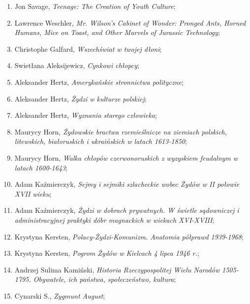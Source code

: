 \documentclass[a4paper,11pt]{article}
\begin{document}
\begin{enumerate}
\item Jon Savage, \textit{Teenage: The Creation of Youth Culture};

\item Lawrence Weschler, \textit{Mr. Wilson's Cabinet of Wonder: Pronged
    Ants, Horned Humans, Mice on Toast, and Other Marvels of Jurassic
    Technology};

\item Christophe Galfard, \textit{Wszechświat w twojej dłoni};

\item Swietłana Aleksijewicz, \textit{Cynkowi chłopcy};

\item Aleksander Hertz, \textit{Amerykańskie stronnictwa polityczne};

\item Aleksander Hertz, \textit{Żydzi w kulturze polskiej};

\item Aleksander Hertz, \textit{Wyznania starego człowieka};

\item Maurycy Horn, \textit{Żydowskie bractwa rzemieślnicze na ziemiach
    polskich, litewskich, białoruskich i ukraińskich w latach
    1613-1850};

\item Maurycy Horn, \textit{Walka chłopów czerwonoruskich z wyzyskiem
    feudalnym w latach 1600-1643};


\item Adam Kaźmierczyk, \textit{Sejmy i sejmiki szlacheckie wobec Żydów
    w II połowie XVII wieku};

\item Adam Kaźmierczyk, \textit{Żydzi w dobrach prywatnych. W świetle
    sądowniczej i administracyjnej praktyki dóbr magnackich w wiekach
    XVI-XVIII};

\item Krystyna Kersten, \textit{Polacy-Żydzi-Komunizm. Anatomia półprawd
    1939-1968};

\item Krystyna Kersten, \textit{Pogrom Żydów w Kielcach 4 lipca 1946
    r.};

\item Andrzej Sulima Kamiński, \textit{Historia Rzeczypospolitej Wielu
    Narodów 1505-1795. Obywatele, ich państwa, społeczeństwo,
    kultura};

\item Cynarski S., \textit{Zygmunt August};


\end{enumerate}
\end{document}
